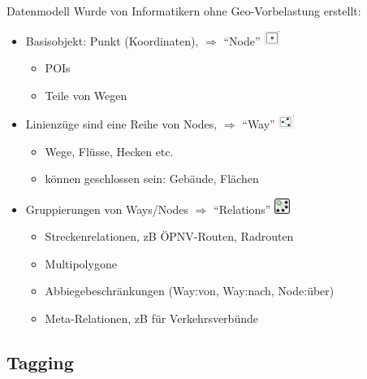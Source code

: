 \documentclass{beamer}
\begin{document}
\begin{frame}{Datenmodell}
Wurde von Informatikern ohne Geo-Vorbelastung erstellt:
\begin{itemize}
  \item Basisobjekt: Punkt (Koordinaten), $\Rightarrow$ "`Node"' \includegraphics[width=0.5cm]{node.png}
  \begin{itemize}
    \item POIs
    \pause
    \item Teile von Wegen
  \end{itemize}
  \item Linienzüge sind eine Reihe von Nodes, $\Rightarrow$ "`Way"' \includegraphics[width=0.5cm]{way.png}
  \begin{itemize}
    \item Wege, Flüsse, Hecken etc.
    \item können geschlossen sein: Gebäude, Flächen
  \end{itemize}
  \pause
  \item Gruppierungen von Ways/Nodes $\Rightarrow$ "`Relations"' \includegraphics[width=0.5cm]{relation.png}
  \begin{itemize}
    \item Streckenrelationen, zB ÖPNV-Routen, Radrouten
    \item Multipolygone
    \item Abbiegebeschränkungen (Way:von, Way:nach, Node:über)
    \item Meta-Relationen, zB für Verkehrsverbünde
  \end{itemize}
\end{itemize}

\end{frame}

\subsection{Tagging}
\end{document}
